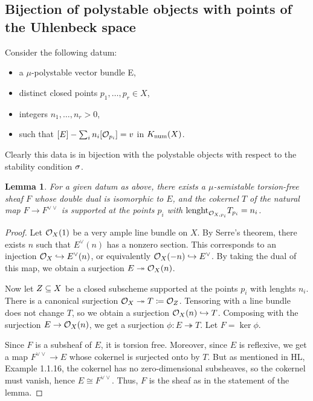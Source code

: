 \documentclass[letterpaper,10pt]{article}
\newtheorem{lem}[thm]{Lemma}
\begin{document}
\subsection{Bijection of polystable objects with points of the Uhlenbeck space}
Consider the following datum: 
\begin{itemize}
    \item a $\mu$-polystable vector bundle E,
    \item distinct closed points $p_1,\ldots,p_r \in X$,
    \item integers $n_1,\ldots,n_r > 0$,
    \item such that $[E] - \sum_i n_i [\mathcal{O}_{p_i}] = v$ in $K_{\mathrm{num}}(X)$.
\end{itemize}
Clearly this data is in bijection with the polystable objects with respect to the stability condition $\sigma$.

\begin{lem}
    For a given datum as above, there exists a $\mu$-semistable torsion-free sheaf $F$ whose double dual is isomorphic to $E$, and the cokernel $T$ of the natural map $F \to F^{\vee \vee}$ is supported at the points $p_i$ with $\mathrm{lenght}_{\mathcal{O}_{X,p_i}} T_{p_i} = n_i$.
\end{lem}
\begin{proof}
    Let $\mathcal{O}_X(1)$ be a very ample line bundle on $X$. By Serre's theorem, there exists $n$ such that $E^\vee(n)$ has a nonzero section. This corresponds to an injection $\mathcal{O}_X \hookrightarrow E^\vee(n)$, or equivalently $\mathcal{O}_X(-n) \hookrightarrow E^\vee$. By taking the dual of this map, we obtain a surjection $E \twoheadrightarrow \mathcal{O}_X(n)$.
    
    Now let $Z \subseteq X$ be a closed subscheme supported at the points $p_i$ with lenghts $n_i$. There is a canonical surjection $\mathcal{O}_X \twoheadrightarrow T \coloneqq \mathcal{O}_Z$. Tensoring with a line bundle does not change $T$, so we obtain a surjection $\mathcal{O}_X(n) \hookrightarrow T$. Composing with the surjection $E \to \mathcal{O}_X(n)$, we get a surjection $\phi: E \twoheadrightarrow T$. Let $F = \ker \phi$.
    
    Since $F$ is a subsheaf of $E$, it is torsion free. Moreover, since $E$ is reflexive, we get a map $F^{\vee \vee} \to E$ whose cokernel is surjected onto by $T$. But as mentioned in HL, Example 1.1.16, the cokernel has no zero-dimensional subsheaves, so the cokernel must vanish, hence $E \cong F^{\vee \vee}$. Thus, $F$ is the sheaf as in the statement of the lemma.
\end{proof}
\end{document}
